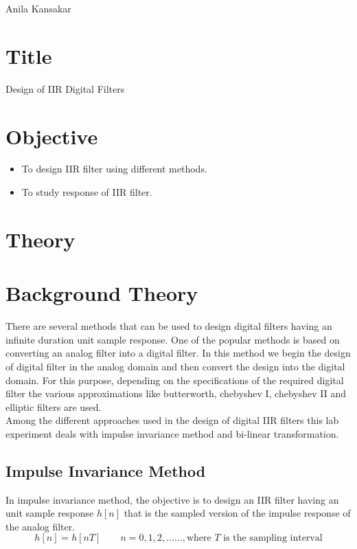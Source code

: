 \documentclass[a4paper,11pt]{article}
\begin{document}
{Anila  Kansakar}

\renewcommand{\contentsname}{Table of Contents}
\tableofcontents

\pagebreak
\lstlistoflistings
\vspace{10em}
\listoffigures
\pagebreak
{}

\section{Title} {\large Design of IIR Digital Filters}
\section{Objective}
\begin {itemize}
\item To design IIR filter using different methods.
\item To study response of IIR filter.
\end{itemize}


\section{Theory}

\section{Background Theory}
There are several methods that can be used to design digital filters having an infinite duration unit sample response. One of the popular methods is based on converting an analog filter into a digital filter. In this method we begin the design of digital filter in the analog domain and then convert the design into the digital domain. For this purpose, depending on the specifications of the required digital filter the various approximations like butterworth, chebyshev I, chebyshev II and elliptic filters are used.\\
Among the different approaches used in the design of digital IIR filters this lab experiment deals with impulse invariance method and bi-linear transformation.
\subsection{Impulse Invariance Method}
In impulse invariance method, the objective is to design an IIR filter having an unit sample response $h[n]$ that is the sampled version of the impulse response of the analog filter.
\begin{equation*}
    h[n]=h[nT] \quad \quad n=0,1,2,\dots\dots, \text{where } T\text{ is the sampling interval}
\end{equation*}
\end{document}
